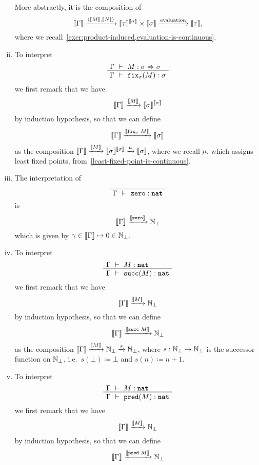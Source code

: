 \begin{definition}
\begin{enumerate}[(i)]
    More abstractly, it is the composition of
    \[
      \llbracket\Gamma\rrbracket \xrightarrow{\langle \llbracket M\rrbracket , \llbracket N\rrbracket \rangle}
      \llbracket\tau\rrbracket^{\llbracket\sigma\rrbracket} \times \llbracket\sigma\rrbracket
      \xrightarrow{\text{evaluation}}
      \llbracket\tau\rrbracket,
    \]
    where we recall~\cref{exer:product-induced,evaluation-is-continuous}.
  \item
    To interpret
    \[
      \def\fCenter{\ \vdash\ }
      \Axiom$\Gamma \fCenter M : \sigma \pcffun \sigma$
      \UnaryInf$\Gamma \fCenter \pcffix_\sigma(M) : \sigma$ \DisplayProof
    \]
    we first remark that we have
    \[
      \llbracket\Gamma\rrbracket \xrightarrow{\llbracket M\rrbracket} \llbracket\sigma\rrbracket^{\llbracket\sigma\rrbracket}
    \]
    by induction hypothesis, so that we can define
    \[
      \llbracket\Gamma\rrbracket \xrightarrow{\llbracket\operatorname{\texttt{fix}}_\sigma\,M\rrbracket} \llbracket\sigma\rrbracket
    \]
    as the composition
    \(\llbracket\Gamma\rrbracket \xrightarrow{\llbracket M\rrbracket} \llbracket\sigma\rrbracket^{\llbracket\sigma\rrbracket}
    \xrightarrow{\mu} \llbracket\sigma\rrbracket\), where we recall \(\mu\), which assigns
    least fixed points, from~\cref{least-fixed-point-is-continuous}.
  \item
    The interpretation of
    \[
      \def\fCenter{\ \vdash\ }
      \AxiomC{}
      \UnaryInf$\Gamma \fCenter \pcfzero : \pcfnat$
      \DisplayProof
    \]
    is
    \[
      \llbracket\Gamma\rrbracket \xrightarrow{\llbracket\texttt{zero}\rrbracket} \mathbb N_\bot
    \]
    which is given by \(\gamma \in \llbracket\Gamma\rrbracket \mapsto 0 \in \mathbb N_\bot\).
  \item
    To interpret
    \[
      \def\fCenter{\ \vdash\ }
      \Axiom$\Gamma \fCenter M : \pcfnat$
      \UnaryInf$\Gamma \fCenter \pcfsuc(M) : \pcfnat$
      \DisplayProof
    \]
    we first remark that we have
    \[
      \llbracket\Gamma\rrbracket \xrightarrow{\llbracket M\rrbracket} \mathbb N_\bot
    \]
    by induction hypothesis, so that we can define
    \[
      \llbracket\Gamma\rrbracket \xrightarrow{\llbracket\operatorname{\texttt{succ}}\,M\rrbracket} \mathbb N_\bot
    \]
    as the composition
    \(\llbracket\Gamma\rrbracket \xrightarrow{\llbracket M\rrbracket} \mathbb N_\bot \xrightarrow{s}
    \mathbb N_\bot\), where \(s : \mathbb N_\bot \to \mathbb N_\bot\) is the successor function
    on \(\mathbb N_\bot\), i.e.\ \(s(\bot) \coloneqq \bot\) and
    \(s(n) \coloneqq n+1\).
  \item
    To interpret
    \[
      \def\fCenter{\ \vdash\ }
      \Axiom$\Gamma \fCenter M : \pcfnat$
      \UnaryInf$\Gamma \fCenter \pcfpred(M) : \pcfnat$
      \DisplayProof
    \]
    we first remark that we have
    \[
      \llbracket\Gamma\rrbracket \xrightarrow{\llbracket M\rrbracket} \mathbb N_\bot
    \]
    by induction hypothesis, so that we can define
    \[
      \llbracket\Gamma\rrbracket \xrightarrow{\llbracket\operatorname{\texttt{pred}}\,M\rrbracket} \mathbb N_\bot
\]
\end{enumerate}
\end{definition}
